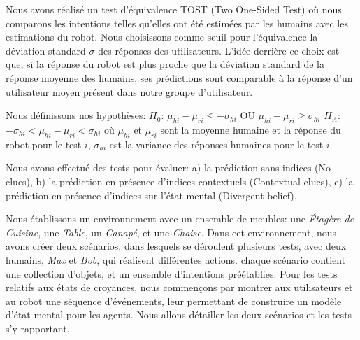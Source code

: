 \documentclass[a4paper,11pt,twoside]{StyleThese}
\begin{document}
Nous avons réalisé un test d'équivalence TOST (Two One-Sided Test) où nous comparons les intentions telles qu'elles ont été estimées par les humains avec les estimations du robot. Nous choisissons comme seuil pour l'équivalence la déviation standard $\sigma$ des réponses des utilisateurs. L'idée derrière ce choix est que, si la réponse du robot est plus proche que la déviation standard de la réponse moyenne des humains, ses prédictions sont comparable à la réponse d'un utilisateur moyen présent dans notre groupe d'utilisateur. 

Nous définissons nos hypothèses:
$H_0$: $\mu_{hi}-\mu_{ri}\leq-\sigma_{hi}$ OU $\mu_{hi}-\mu_{ri}\geq\sigma_{hi}$
$H_A$: $-\sigma_{hi}<\mu_{hi}-\mu_{ri}<\sigma_{hi}$
où $\mu_{hi}$ et $\mu_{ri}$ sont la moyenne humaine et la réponse du robot pour le test $i$, $\sigma_{hi}$ est la variance des réponses humaines pour le test $i$.

Nous avons effectué des tests pour évaluer: a) la prédiction sans indices (No clues), b) la prédiction en présence d'indices contextuels (Contextual clues), c) la prédiction en présence d'indices sur l'état mental (Divergent belief).

Nous établissons un environnement avec un ensemble de meubles: une \textit{Étagère de Cuisine}, une \textit{Table}, un \textit{Canapé}, et une \textit{Chaise}. Dans cet environnement, nous avons créer deux scénarios, dans lesquels se déroulent plusieurs tests, avec deux humains, \textit{Max} et \textit{Bob}, qui réalisent différentes actions. chaque scénario contient une collection d'objets, et un ensemble d'intentions préétablies. Pour les tests relatifs aux états de croyances, nous commençons par montrer aux utilisateurs et au robot une séquence d'événements, leur permettant de construire un modèle d'état mental pour les agents. Nous allons détailler les deux scénarios et les tests s'y rapportant.
\end{document}
